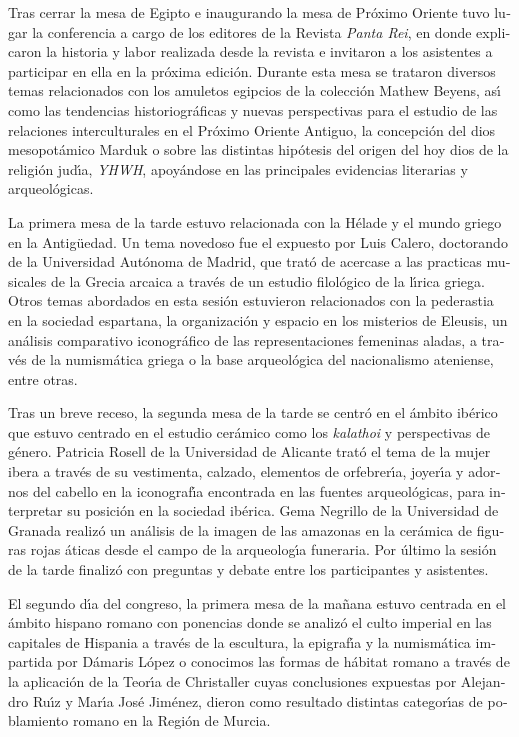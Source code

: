 \begin{otherlanguage}{spanish}
Tras cerrar la mesa de Egipto e inaugurando la mesa de Pr\'{o}ximo Oriente tuvo lugar la conferencia a cargo de los editores de la Revista \textit{Panta Rei}, en donde explicaron la historia y labor realizada desde la revista e invitaron a los asistentes a participar en ella en la pr\'{o}xima edici\'{o}n. Durante esta mesa se trataron diversos temas relacionados con los amuletos egipcios de la colecci\'{o}n Mathew Beyens, as\'{\i} como las tendencias historiogr\'{a}ficas y nuevas perspectivas para el estudio de las relaciones interculturales en el Pr\'{o}ximo Oriente Antiguo, la concepci\'{o}n del dios mesopot\'{a}mico Marduk o sobre las distintas hip\'{o}tesis del origen del hoy dios de la religi\'{o}n jud\'{\i}a, \textit{YHWH}, apoy\'{a}ndose en las principales evidencias literarias y arqueol\'{o}gicas.

La primera mesa de la tarde estuvo relacionada con la H\'{e}lade y el mundo griego en la Antig\"{u}edad. Un tema novedoso fue el expuesto por Luis Calero, doctorando de la Universidad Aut\'{o}noma de Madrid,  que trat\'{o} de acercase a las practicas musicales de la Grecia arcaica a trav\'{e}s de un estudio filol\'{o}gico de la l\'{\i}rica griega. Otros temas abordados en esta sesi\'{o}n estuvieron relacionados con la pederastia en la sociedad espartana, la organizaci\'{o}n y espacio en los misterios de Eleusis, un an\'{a}lisis comparativo iconogr\'{a}fico de las representaciones femeninas aladas, a trav\'{e}s de la numism\'{a}tica griega o la base arqueol\'{o}gica del nacionalismo ateniense, entre otras. 

Tras un breve receso, la segunda mesa de la tarde se centr\'{o} en el \'{a}mbito ib\'{e}rico que estuvo centrado en el estudio cer\'{a}mico como los \textit{kalathoi} y perspectivas de g\'{e}nero. Patricia Rosell de la Universidad de Alicante trat\'{o} el tema de la mujer ibera a trav\'{e}s de su vestimenta, calzado, elementos de orfebrer\'{\i}a, joyer\'{\i}a y adornos del cabello en la iconograf\'{\i}a encontrada en las fuentes arqueol\'{o}gicas, para interpretar su posici\'{o}n en la sociedad ib\'{e}rica. Gema Negrillo de la Universidad de Granada realiz\'{o} un an\'{a}lisis de la imagen de las amazonas en la cer\'{a}mica de figuras rojas \'{a}ticas desde el campo de la arqueolog\'{\i}a funeraria.  Por \'{u}ltimo la sesi\'{o}n de la tarde finaliz\'{o} con preguntas y debate entre los participantes y asistentes.
 
El segundo d\'{\i}a del congreso, la primera mesa de la ma\~{n}ana estuvo centrada en el \'{a}mbito hispano romano con ponencias donde se analiz\'{o} el culto imperial en las capitales de Hispania a trav\'{e}s de la escultura, la epigraf\'{\i}a y la numism\'{a}tica impartida por D\'{a}maris L\'{o}pez o conocimos las formas de h\'{a}bitat romano a trav\'{e}s de la aplicaci\'{o}n de la Teor\'{\i}a de Christaller cuyas conclusiones expuestas por Alejandro Ru\'{\i}z y Mar\'{\i}a Jos\'{e} Jim\'{e}nez, dieron como resultado distintas categor\'{\i}as de poblamiento romano en la Regi\'{o}n de Murcia. 


\end{otherlanguage}
